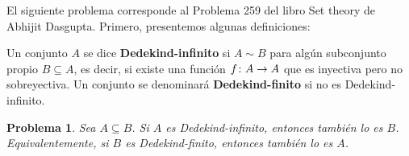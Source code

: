 \documentclass[a4,10pt]{aleph-notas}
\newtheorem*{prob}{Problema}
\begin{document}
\encabezado

\noindent
El siguiente problema corresponde al Problema 259 del libro Set theory de Abhijit Dasgupta. Primero, presentemos algunas definiciones:

\begin{defi}
    Un conjunto $A$ se dice \textbf{Dedekind-infinito} si $A \sim B$ para algún subconjunto propio $B \subseteq A$, es decir, si existe una función $f\colon A \rightarrow A$ que es inyectiva pero no sobreyectiva. Un conjunto se denominará \textbf{Dedekind-finito} si no es Dedekind-infinito.
\end{defi}

\begin{prob}
    Sea $A \subseteq B$. Si $A$ es Dedekind-infinito, entonces también lo es $B$. Equivalentemente, si $B$ es Dedekind-finito, entonces también lo es $A$.
\end{prob}
\end{document}
